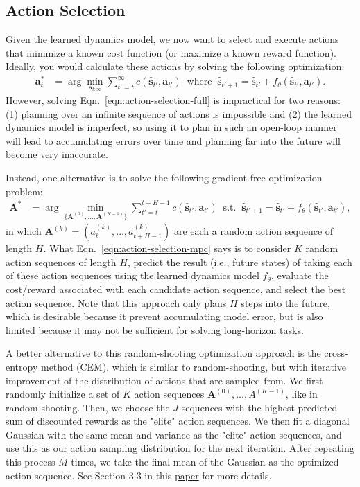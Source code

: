\documentclass{article} %
\newcommand{\bs}{\mathbf{s}}
\newcommand{\ba}{\mathbf{a}}
\newcommand{\bA}{\mathbf{A}}
\begin{document}
\subsection{Action Selection}

Given the learned dynamics model, we now want to select and execute actions that minimize a known cost function (or maximize a known reward function). Ideally, you would calculate these actions by solving the following optimization:
\begin{align}
\ba_t^* &= \arg\min_{\ba_{t:\infty}} \sum_{t'=t}^\infty c(\hat{\bs}_{t'}, \ba_{t'}) \;\;\text{where}\;\; \hat{\bs}_{t'+1} = \hat{\bs}_{t'} + f_\theta(\hat{\bs}_{t'}, \ba_{t'}). \label{eqn:action-selection-full}
\end{align}
However, solving Eqn.~\ref{eqn:action-selection-full} is impractical for two reasons: (1) planning over an infinite sequence of actions is impossible and (2) the learned dynamics model is imperfect, so using it to plan in such an open-loop manner will lead to accumulating errors over time and planning far into the future will become very inaccurate. 

Instead, one alternative is to solve the following gradient-free optimization problem:
\begin{align}
\bA^* &= \arg\min_{\{\bA^{(0)}, ..., \bA^{(K-1)}\}} \sum_{t'=t}^{t+H-1} c(\hat{\bs}_{t'}, \ba_{t'}) \;\;\text{s.t.}\;\; \hat{\bs}_{t'+1} = \hat{\bs}_{t'} + f_\theta(\hat{\bs}_{t'}, \ba_{t'}), \label{eqn:action-selection-mpc}
\end{align}
in which $\bA^{(k)} = (a_t^{(k)}, \dots, a_{t+H-1}^{(k)})$ are each a random action sequence of length $H$. What Eqn.~\ref{eqn:action-selection-mpc} says is to consider $K$ random action sequences of length $H$, predict the result (i.e., future states) of taking each of these action sequences using the learned dynamics model $f_\theta$, evaluate the cost/reward associated with each candidate action sequence, and select the best action sequence. Note that this approach only plans $H$ steps into the future, which is desirable because it prevent accumulating model error, but is also limited because it may not be sufficient for solving long-horizon tasks. 

A better alternative to this random-shooting optimization approach is the cross-entropy method (CEM), which is similar to random-shooting, but with iterative improvement of the distribution of actions that are sampled from. We first randomly initialize a set of $K$ action sequences $\bA^{(0)}, ..., A^{(K-1)}$, like in random-shooting. Then, we choose the $J$ sequences with the highest predicted sum of discounted rewards as the "elite" action sequences. We then fit a diagonal Gaussian with the same mean and variance as the "elite" action sequences, and use this as our action sampling distribution for the next iteration. After repeating this process $M$ times, we take the final mean of the Gaussian as the optimized action sequence. See Section 3.3 in this \href{https://arxiv.org/pdf/1909.11652.pdf}{paper} for more details.
\end{document}
